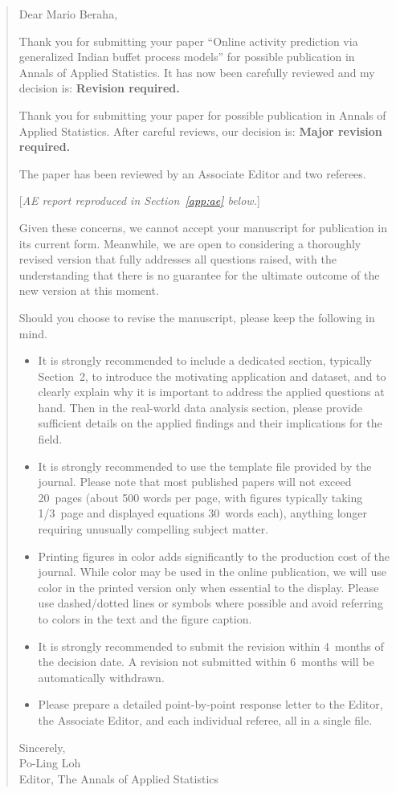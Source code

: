 \begin{quote}
\small
Dear Mario Beraha,

Thank you for submitting your paper ``Online activity prediction via
generalized Indian buffet process models'' for possible publication
in Annals of Applied Statistics.
It has now been carefully reviewed and my decision is:
\textbf{Revision required.}

Thank you for submitting your paper for possible publication in
Annals of Applied Statistics. After careful reviews, our decision is:
\textbf{Major revision required.}

The paper has been reviewed by an Associate Editor and two referees.

[\emph{AE report reproduced in Section~\ref{app:ae} below.}]

Given these concerns, we cannot accept your manuscript for publication
in its current form. Meanwhile, we are open to considering a
thoroughly revised version that fully addresses all questions raised,
with the understanding that there is no guarantee for the ultimate
outcome of the new version at this moment.

Should you choose to revise the manuscript, please keep the following
in mind.
\begin{itemize}[leftmargin=*]
  \item It is strongly recommended to include a dedicated section,
        typically Section~2, to introduce the motivating application
        and dataset, and to clearly explain why it is important to
        address the applied questions at hand. Then in the real-world
        data analysis section, please provide sufficient details on
        the applied findings and their implications for the field.
  \item It is strongly recommended to use the template file provided
        by the journal. Please note that most published papers will
        not exceed 20~pages (about 500 words per page, with figures
        typically taking 1/3~page and displayed equations 30~words
        each), anything longer requiring unusually compelling subject
        matter.
  \item Printing figures in color adds significantly to the production
        cost of the journal. While color may be used in the online
        publication, we will use color in the printed version only
        when essential to the display. Please use dashed/dotted lines
        or symbols where possible and avoid referring to colors in the
        text and the figure caption.
  \item It is strongly recommended to submit the revision within
        4~months of the decision date. A revision not submitted within
        6~months will be automatically withdrawn.
  \item Please prepare a detailed point-by-point response letter to
        the Editor, the Associate Editor, and each individual referee,
        all in a single file.
\end{itemize}

Sincerely,\\
Po-Ling Loh\\
Editor, The Annals of Applied Statistics
\end{quote}


